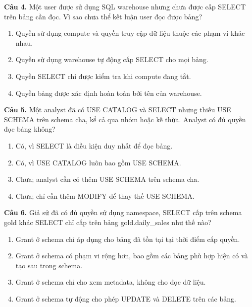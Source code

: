 \noindent\begin{minipage}{\linewidth}
\small
\textbf{Câu 4.} Một user được sử dụng SQL warehouse nhưng chưa được cấp SELECT trên bảng cần đọc. Vì sao chưa thể kết luận user đọc được bảng?
\begin{enumerate}[label=\textbf{\Alph*.},leftmargin=2em,itemsep=0pt,topsep=2pt]
\item Quyền sử dụng compute và quyền truy cập dữ liệu thuộc các phạm vi khác nhau.
\item Quyền sử dụng warehouse tự động cấp SELECT cho mọi bảng.
\item Quyền SELECT chỉ được kiểm tra khi compute đang tắt.
\item Quyền bảng được xác định hoàn toàn bởi tên của warehouse.
\end{enumerate}
\end{minipage}\par\addvspace{0.5em}

\noindent\begin{minipage}{\linewidth}
\small
\textbf{Câu 5.} Một analyst đã có USE CATALOG và SELECT nhưng thiếu USE SCHEMA trên schema cha, kể cả qua nhóm hoặc kế thừa. Analyst có đủ quyền đọc bảng không?
\begin{enumerate}[label=\textbf{\Alph*.},leftmargin=2em,itemsep=0pt,topsep=2pt]
\item Có, vì SELECT là điều kiện duy nhất để đọc bảng.
\item Có, vì USE CATALOG luôn bao gồm USE SCHEMA.
\item Chưa; analyst cần có thêm USE SCHEMA trên schema cha.
\item Chưa; chỉ cần thêm MODIFY để thay thế USE SCHEMA.
\end{enumerate}
\end{minipage}\par\addvspace{0.5em}

\noindent\begin{minipage}{\linewidth}
\small
\textbf{Câu 6.} Giả sử đã có đủ quyền sử dụng namespace, SELECT cấp trên schema gold khác SELECT chỉ cấp trên bảng gold.daily\_sales như thế nào?
\begin{enumerate}[label=\textbf{\Alph*.},leftmargin=2em,itemsep=0pt,topsep=2pt]
\item Grant ở schema chỉ áp dụng cho bảng đã tồn tại tại thời điểm cấp quyền.
\item Grant ở schema có phạm vi rộng hơn, bao gồm các bảng phù hợp hiện có và tạo sau trong schema.
\item Grant ở schema chỉ cho xem metadata, không cho đọc dữ liệu.
\item Grant ở schema tự động cho phép UPDATE và DELETE trên các bảng.
\end{enumerate}
\end{minipage}\par\addvspace{0.5em}

